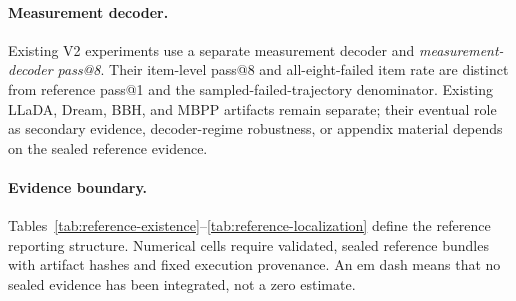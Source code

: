 \paragraph{Measurement decoder.}
Existing V2 experiments use a separate measurement decoder and
\emph{measurement-decoder pass@8}. Their item-level pass@8 and all-eight-failed
item rate are distinct from reference pass@1 and the sampled-failed-trajectory
denominator. Existing LLaDA, Dream, BBH, and MBPP artifacts remain separate;
their eventual role as secondary evidence, decoder-regime robustness, or
appendix material depends on the sealed reference evidence.

\paragraph{Evidence boundary.}
Tables~\ref{tab:reference-existence}--\ref{tab:reference-localization} define the
reference reporting structure. Numerical cells require validated, sealed
reference bundles with artifact hashes and fixed execution provenance. An
em dash means that no sealed evidence has been integrated, not a zero estimate.
